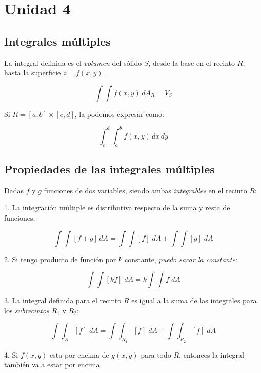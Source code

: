 \setcounter{section}{3}

\section{Unidad 4}

\subsection{Integrales múltiples}

La integral definida es el \textit{volumen} del sólido \(S\),
desde la base en el recinto \(R\),
hasta la superficie \(z = f(x,y)\).

\begin{equation*}
    \int\int f(x,y)\,dA_R = V_S
\end{equation*}

Si \(R = [a,b] \times [c,d]\), la podemos expresar como:

\begin{equation*}
    \int_{c}^{d}\int_{a}^{b} f(x,y) \,dx\,dy
\end{equation*}

\subsection{Propiedades de las integrales múltiples}

Dadas \(f\) y \(g\) funciones de dos variables,
siendo ambas \textit{integrables} en el recinto \(R\):

1. La integración múltiple es distributiva respecto de la suma y resta de funciones:

\begin{equation*}
    \int\int [f \pm g] \,dA = \int\int [f] \;dA \pm \int\int [g] \;dA
\end{equation*}

2. Si tengo producto de función por \(k\) constante, 
\textit{puedo sacar la constante}:

\begin{equation*}
    \int\int [kf] \; dA = k \int\int f \; dA
\end{equation*}

3. La integral definida para el recinto \(R\) 
es igual a la suma de las integrales para 
los \textit{subrecintos} \(R_1\) y \(R_2\):

\begin{equation*}
    \int\int_R [f] \; dA = \int\int_{R_1} [f] \; dA + \int\int_{R_2} [f] \; dA
\end{equation*}

4. Si \(f(x,y)\) esta por encima de \(g(x,y)\) para todo \(R\), 
entonces la integral también va a estar por encima.
